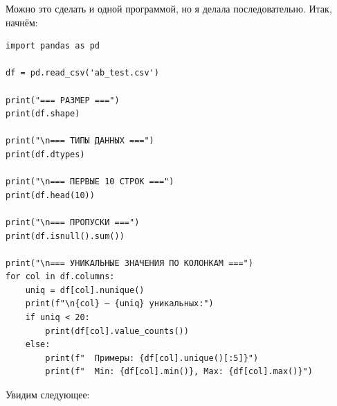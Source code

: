 \documentclass[pract]{SCWorks}
\begin{document}
Можно это сделать и одной программой, но я делала последовательно. Итак, начнём:

\begin{verbatim}
import pandas as pd

df = pd.read_csv('ab_test.csv')

print("=== РАЗМЕР ===")
print(df.shape)

print("\n=== ТИПЫ ДАННЫХ ===")
print(df.dtypes)

print("\n=== ПЕРВЫЕ 10 СТРОК ===")
print(df.head(10))

print("\n=== ПРОПУСКИ ===")
print(df.isnull().sum())

print("\n=== УНИКАЛЬНЫЕ ЗНАЧЕНИЯ ПО КОЛОНКАМ ===")
for col in df.columns:
    uniq = df[col].nunique()
    print(f"\n{col} — {uniq} уникальных:")
    if uniq < 20:
        print(df[col].value_counts())
    else:
        print(f"  Примеры: {df[col].unique()[:5]}")
        print(f"  Min: {df[col].min()}, Max: {df[col].max()}")
\end{verbatim}

Увидим следующее:
\end{document}

